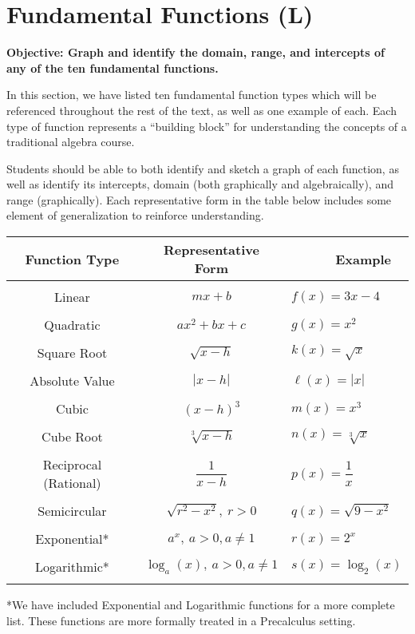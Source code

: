 \documentclass[12pt]{book}
\theoremstyle{definition}
\begin{document}
\section{Fundamental Functions (L)}
{\bf Objective: Graph and identify the domain, range, and intercepts of any of the ten fundamental functions.}\par
In this section, we have listed ten fundamental function types which will be referenced throughout the rest of the text, as well as one example of each.  Each type of function represents a ``building block'' for understanding the concepts of a traditional algebra course.\par
Students should be able to both identify and sketch a graph of each function, as well as identify its intercepts, domain (both graphically and algebraically), and range (graphically).  Each representative form in the table below includes some element of generalization to reinforce understanding.\par
\begin{center}
\begin{tabular}{|c|c|l|}
\hline
Function Type & Representative Form & ~~~~~~Example\\
\hline
&&\\
Linear & $mx+b$ & $f(x)=3x-4$\\
&&\\
Quadratic & $ax^2+bx+c$ & $g(x)=x^2$\\
&&\\
Square Root & $\sqrt{x-h}$ & $k(x)=\sqrt{x}$\\
&&\\
Absolute Value & $|x-h|$ & $\ell(x)=|x|$\\
&&\\
Cubic & $(x-h)^3$ & $m(x)=x^3$\\
&&\\
Cube Root & $\sqrt[3]{x-h}$ & $n(x)=\sqrt[3]{x}$\\
&&\\
Reciprocal (Rational) & $\dfrac{1}{x-h}$ & $p(x)=\dfrac{1}{x}$\\
&&\\
Semicircular & $\sqrt{r^2-x^2},~r>0$ & $q(x)=\sqrt{9-x^2}$\\
&&\\
Exponential* & $a^x,~a>0, a\neq 1$ & $r(x)=2^x$\\
&&\\
Logarithmic* & $\log_a(x),~a>0, a\neq1$ & $s(x)=\log_2(x)$\\
&&\\
\hline
\end{tabular}
\end{center}
*We have included Exponential and Logarithmic functions for a more complete list.  These functions are more formally treated in a Precalculus setting. 
\end{document}
